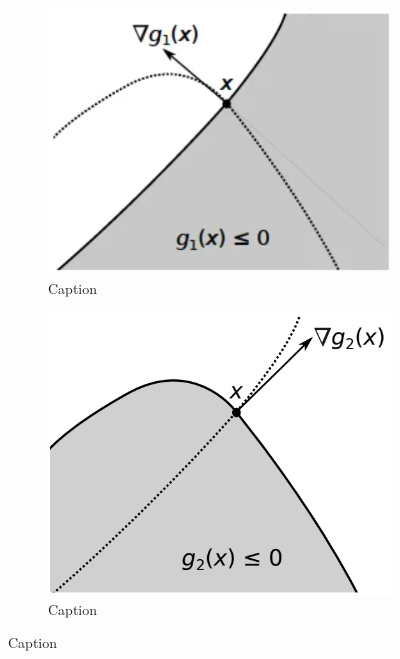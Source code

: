 \begin{figure}
    \begin{subfigure}{0.31\textwidth}
        \centering
        \includegraphics[width=\linewidth]{figures/3/chapter3-feasible_cone1.png}
        \caption{Caption}
        \label{fig:feasible1}
    \end{subfigure}
    \begin{subfigure}{0.31\textwidth}
        \centering
        \includegraphics[width=\linewidth]{figures/3/chapter3-feasible_cone2.png}
        \caption{Caption}
        \label{fig:feasible2}
    \end{subfigure}

\end{figure}
